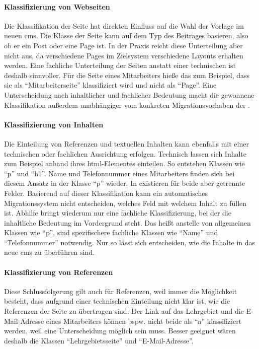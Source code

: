         \paragraph{Klassifizierung von Webseiten}
        Die Klassifikation der Seite hat direkten Einfluss auf die Wahl der Vorlage im neuen \gls{cms}.
        Die Klasse der Seite kann auf dem Typ des Beitrages basieren,
        also ob er ein Post oder eine Page ist.
        In der Praxis reicht diese Unterteilung aber nicht aus,
        da verschiedene {\wordpress} Pages im Zielsystem verschiedene Layouts erhalten werden.
        Eine fachliche Unterteilung der Seiten anstatt einer technischen ist deshalb sinnvoller.
        Für die Seite eines Mitarbeiters hieße das zum Beispiel,
        dass sie als "`Mitarbeiterseite"' klassifiziert wird und nicht als "`Page"'.
        Eine Unterscheidung nach inhaltlicher und fachlicher Bedeutung macht die
        gewonnene Klassifikation außerdem unabhängiger vom konkreten
        Migrationsvorhaben der {\fernUni}.

        \paragraph{Klassifizierung von Inhalten}
        Die Einteilung von Referenzen und textuellen Inhalten kann ebenfalls
        mit einer technischen oder fachlichen Ausrichtung erfolgen.
        Technisch lassen sich Inhalte zum Beispiel anhand ihres \gls{html}-Elementes einteilen.
        So entstehen Klassen wie "`p"' und "`h1"'.
        Name und Telefonnummer eines Mitarbeiters finden sich bei diesem Ansatz in der Klasse "`p"' wieder.
        In {\imperia} existieren für beide aber getrennte Felder.
        Basierend auf dieser Klassifikation kann ein automatisches Migrationssystem
        nicht entscheiden, welches Feld mit welchem Inhalt zu füllen ist.
        Abhilfe bringt wiederum nur eine fachliche Klassifizierung,
        bei der die inhaltliche Bedeutung im Vordergrund steht.
        Das heißt anstelle von allgemeinen Klassen wie "`p"',
        sind spezifischere fachliche Klassen wie
        "`Name"' und "`Telefonnummer"' notwendig.
        Nur so lässt sich entscheiden, wie die Inhalte in das neue \gls{cms}
        zu überführen sind.

        \paragraph{Klassifizierung von Referenzen}
        Diese Schlussfolgerung gilt auch für Referenzen,
        weil immer die Möglichkeit besteht,
        dass aufgrund einer technischen Einteilung nicht klar ist,
        wie die Referenzen der Seite zu übertragen sind.
        Der Link auf das Lehrgebiet und die E-Mail-Adresse eines Mitarbeiters
        können bspw. nicht beide als "`a"' klassifiziert werden,
        weil eine Unterscheidung möglich sein muss.
        Besser geeignet wären deshalb die Klassen "`Lehrgebietsseite"'
        und "`E-Mail-Adresse"'.


